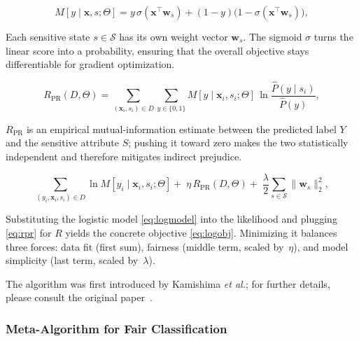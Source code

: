 \documentclass[12pt,a4paper,openright,twoside]{book}
\begin{document}
\begin{equation}
M[y\mid\mathbf{x},s;\Theta]=
y\,\sigma(\mathbf{x}^{\top}\mathbf{w}_{s})+
(1-y)\bigl(1-\sigma(\mathbf{x}^{\top}\mathbf{w}_{s})\bigr),
\tag{8}\label{eq:logmodel}
\end{equation}

\noindent
Each sensitive state \(s\in\mathcal{S}\) has its own weight vector \(\mathbf{w}_{s}\).  The sigmoid \(\sigma\) turns the linear score into a probability, ensuring that the overall objective stays differentiable for gradient optimization.

\begin{equation}
R_{\mathrm{PR}}(D,\Theta)=
\sum_{(\mathbf{x}_i,s_i)\in D}
\sum_{y\in\{0,1\}}
M[y\mid\mathbf{x}_i,s_i;\Theta]\,
\ln\frac{\hat{P}(y\mid s_i)}{\hat{P}(y)},
\tag{11}\label{eq:rpr}
\end{equation}

\noindent
\(R_{\mathrm{PR}}\) is an empirical mutual-information estimate between the predicted label \(Y\) and the sensitive attribute \(S\); pushing it toward zero makes the two statistically independent and therefore mitigates indirect prejudice.

\begin{equation}
\sum_{(y_i,\mathbf{x}_i,s_i)\in D}
\ln M[y_i\mid\mathbf{x}_i,s_i;\Theta]
+\;
\eta\,R_{\mathrm{PR}}(D,\Theta)
+\;
\frac{\lambda}{2}\sum_{s\in\mathcal{S}}\lVert\mathbf{w}_{s}\rVert_{2}^{2},
\tag{12}\label{eq:logobj}
\end{equation}

\noindent
Substituting the logistic model \eqref{eq:logmodel} into the likelihood and plugging \eqref{eq:rpr} for \(R\) yields the concrete objective \eqref{eq:logobj}.  Minimizing it balances three forces: data fit (first sum), fairness (middle term, scaled by~\(\eta\)), and model simplicity (last term, scaled by~\(\lambda\)).

The algorithm was first introduced by Kamishima \emph{et al.}; for further details, please consult the original paper~\cite{kamishima2012prejudiceremoverregularizer}.

\subsubsection{Meta-Algorithm for Fair Classification}
\end{document}
